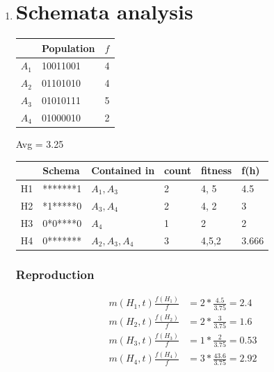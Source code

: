 \documentclass{article}
\begin{document}
\begin{enumerate}
\begin{itemize}
    \end{itemize}
    \item \section*{Schemata analysis}
        \begin{table}[h]
            \centering
            \begin{tabular}{l|l|l}
                & Population & $f$ \\
                \hline
                $A_1$ & 10011001  & 4 \\
                $A_2$ & 01101010  & 4 \\
                $A_3$ & 01010111  & 5 \\
                $A_4$ & 01000010  & 2 
            \end{tabular}
        \end{table}
        Avg = 3.25
        \begin{table}[h]
            \centering
            \begin{tabular}{l|l|l|l|l|l}
                & Schema & Contained in &count & fitness & f(h) \\
                \hline
                H1& *******1 & $A_1, A_3$ & 2 & 4, 5 & 4.5\\
                H2& *1*****0 & $A_3, A_4$ & 2 & 4, 2 & 3\\
                H3& 0*0****0 & $A_4$ & 1 & 2 & 2\\
                H4& 0******* & $A_2, A_3, A_4$ &3 & 4,5,2 & 3.666\\
            \end{tabular}
        \end{table}

        \subsubsection*{Reproduction}
        \begin{align*}
            m(H_1,t) \frac{f(H_1)}{f}&= 2 *\frac{4.5}{3.75} = 2.4\\
            m(H_2,t) \frac{f(H_2)}{f}&= 2 *\frac{3}{3.75} = 1.6\\
            m(H_3,t) \frac{f(H_3)}{f}&= 1 *\frac{2}{3.75} = 0.53\\
            m(H_4,t) \frac{f(H_4)}{f}&= 3 *\frac{43.6}{3.75} = 2.92\\
        \end{align*}


\end{enumerate}
\end{document}

